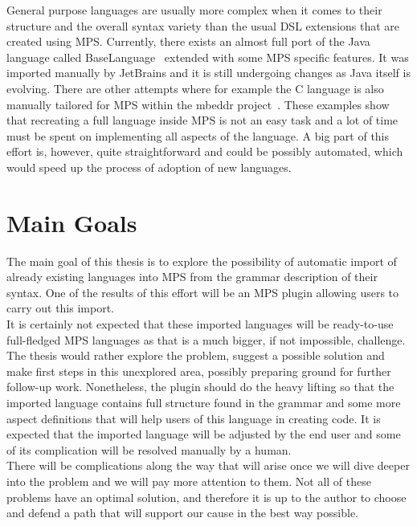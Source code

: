 General purpose languages are usually more complex when it comes to their structure and the overall syntax variety than the usual DSL extensions that are created using MPS.
Currently, there exists an almost full port of the Java language called BaseLanguage~\cite{BaseLanguage} extended with some MPS specific features.
It was imported manually by JetBrains and it is still undergoing changes as Java itself is evolving.
There are other attempts where for example the C language is also manually tailored for MPS within the mbeddr project~\cite{mbeddr}.
These examples show that recreating a full language inside MPS is not an easy task and a lot of time must be spent on implementing all aspects of the language.
A big part of this effort is, however, quite straightforward and could be possibly automated, which would speed up the process of adoption of new languages.

\section{Main Goals}
\label{chap:main_goals}

The main goal of this thesis is to explore the possibility of automatic import of already existing languages into MPS from the grammar description of their syntax.
One of the results of this effort will be an MPS plugin allowing users to carry out this import.
\\

It is certainly not expected that these imported languages will be ready-to-use full-fledged MPS languages as that is a much bigger, if not impossible, challenge.
The thesis would rather explore the problem, suggest a possible solution and make first steps in this unexplored area, possibly preparing ground for further follow-up work.
Nonetheless, the plugin should do the heavy lifting so that the imported language contains full structure found in the grammar and some more aspect definitions that will help users of this language in creating code.
It is expected that the imported language will be adjusted by the end user and some of its complication will be resolved manually by a human.
\\

There will be complications along the way that will arise once we will dive deeper into the problem and we will pay more attention to them.
Not all of these problems have an optimal solution, and therefore it is up to the author to choose and defend a path that will support our cause in the best way possible.
\\

